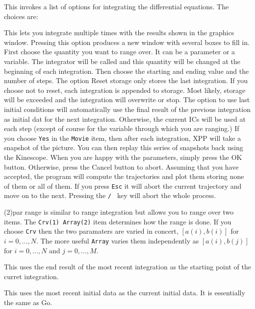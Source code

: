 \documentclass{article}
\newcommand{\tc}[1]{\addcontentsline{toc}{subsection}{#1}}
\begin{document}
\begin{description}

\tc{ICs}\item[(I)nitial conds] This invokes a list of options for integrating the
 differential equations.  The choices are:
\begin{description}
\item[(R)ange]  This lets you integrate multiple times with the results shown
 in the graphics window.  Pressing this option produces a new window with
 several boxes to fill in.  First choose the quantity you want to range
 over.  It can be a parameter or a variable.  The integrator will be called
 and this quantity will be changed at the beginning of each integration.
  Then choose the starting and ending value and the number of steps. The
 option Reset storage only stores the last integration.  If you choose not
 to reset, each integration is appended to storage.  Most likely, storage
 will be exceeded and the integration will overwrite or stop. The option
to use last initial conditions will automatically use the final result of
 the previous integration as initial dat for the next integration.  Otherwise,
 the current ICs will be used at each step (except of course for the  variable
 through which you are ranging.)
If you choose {\tt Yes} in the {\tt Movie} item,
then after each integration, XPP will take a snapshot of the picture.
You can then replay this series of snapshots back using the Kinescope.
When you are happy with the parameters, simply
 press the OK button.  Otherwise, press the Cancel button to abort.  Assuming
 that you have accepted, the program will compute the trajectories and plot
them storing none of them or all of them.  If you press {\tt Esc} it will abort the
current trajectory and move on to the next.  Pressing the {\tt / } key will abort
 the whole process.
\item{(2)par range} is similar to range integration but allows you to
range over two items. The {\tt Crv(1) Array(2)} item determines how
the range is done. If you choose {\tt Crv} then the two paramaters are
varied in concert, $[a(i),b(i)]$ for $i=0,\ldots,N$. The more useful
{\tt Array} varies them independently as $[a(i),b(j)]$ for
$i=0,\ldots,N$ and $j=0,\ldots,M.$
\item[(L)ast]  This uses the end result of the most recent integration as the
 starting point of the curret integration.
\item[(O)ld] This uses the most recent initial data as the current initial
data.  It is essentially the same as Go.

\end{description}
\end{description}
\end{document}
